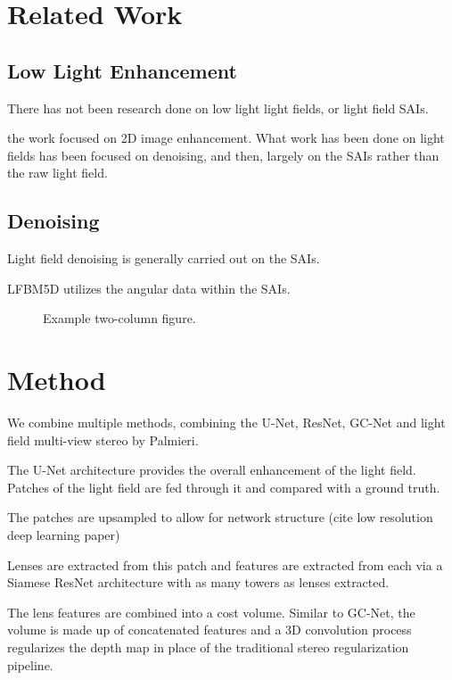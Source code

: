\documentclass[10pt,journal,compsoc]{IEEEtran}
\begin{document}
\section{Related Work}
\subsection{Low Light Enhancement}
There has not been research done on low light light fields, or light field SAIs.

the work focused on 2D image enhancement. What work has been done on light fields has been focused on denoising, and then, largely on the SAIs rather than the raw light field. 

\subsection{Denoising}
Light field denoising is generally carried out on the SAIs. 

LFBM5D utilizes the angular data within the SAIs.

\begin{figure*}[!t]
\centering
{}
\caption{Example two-column figure.}
\end{figure*}

\section{Method}
We combine multiple methods, combining the U-Net, ResNet, GC-Net and light field multi-view stereo by Palmieri.

The U-Net architecture provides the overall enhancement of the light field. Patches of the light field are fed through it and compared with a ground truth.

The patches are upsampled to allow for network structure (cite low resolution deep learning paper)

Lenses are extracted from this patch and features are extracted from each via a Siamese ResNet architecture with as many towers as lenses extracted.

The lens features are combined into a cost volume. Similar to GC-Net, the volume is made up of concatenated features and a 3D convolution process regularizes the depth map in place of the traditional stereo regularization pipeline.
\end{document}

